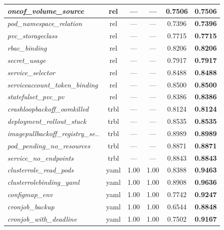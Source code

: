 \begin{footnotesize}
\begin{longtable}{|p{3.6cm}|c|c|c|c|c|}
\hline
\textit{oneof\_\allowbreak{}volume\_\allowbreak{}source} & rel & --- & --- & 0.7506 & \textbf{0.7506} \\
\hline
\textit{pod\_\allowbreak{}namespace\_\allowbreak{}relation} & rel & --- & --- & 0.7396 & \textbf{0.7396} \\
\hline
\textit{pvc\_\allowbreak{}storageclass} & rel & --- & --- & 0.7715 & \textbf{0.7715} \\
\hline
\textit{rbac\_\allowbreak{}binding} & rel & --- & --- & 0.8206 & \textbf{0.8206} \\
\hline
\textit{secret\_\allowbreak{}usage} & rel & --- & --- & 0.7917 & \textbf{0.7917} \\
\hline
\textit{service\_\allowbreak{}selector} & rel & --- & --- & 0.8488 & \textbf{0.8488} \\
\hline
\textit{serviceaccount\_\allowbreak{}token\_\allowbreak{}binding} & rel & --- & --- & 0.8500 & \textbf{0.8500} \\
\hline
\textit{statefulset\_\allowbreak{}pvc\_\allowbreak{}pv} & rel & --- & --- & 0.8386 & \textbf{0.8386} \\
\hline
\textit{crashloopbackoff\_\allowbreak{}oomkilled} & trbl & --- & --- & 0.8124 & \textbf{0.8124} \\
\hline
\textit{deployment\_\allowbreak{}rollout\_\allowbreak{}stuck} & trbl & --- & --- & 0.8535 & \textbf{0.8535} \\
\hline
\textit{imagepullbackoff\_\allowbreak{}registry\_\allowbreak{}se..} & trbl & --- & --- & 0.8989 & \textbf{0.8989} \\
\hline
\textit{pod\_\allowbreak{}pending\_\allowbreak{}no\_\allowbreak{}resources} & trbl & --- & --- & 0.8871 & \textbf{0.8871} \\
\hline
\textit{service\_\allowbreak{}no\_\allowbreak{}endpoints} & trbl & --- & --- & 0.8843 & \textbf{0.8843} \\
\hline
\textit{clusterrole\_\allowbreak{}read\_\allowbreak{}pods} & yaml & 1.00 & 1.00 & 0.8388 & \textbf{0.9463} \\
\hline
\textit{clusterrolebinding\_\allowbreak{}yaml} & yaml & 1.00 & 1.00 & 0.8908 & \textbf{0.9636} \\
\hline
\textit{configmap\_\allowbreak{}env} & yaml & 1.00 & 1.00 & 0.7742 & \textbf{0.9247} \\
\hline
\textit{cronjob\_\allowbreak{}backup} & yaml & 1.00 & 1.00 & 0.6544 & \textbf{0.8848} \\
\hline
\textit{cronjob\_\allowbreak{}with\_\allowbreak{}deadline} & yaml & 1.00 & 1.00 & 0.7502 & \textbf{0.9167} \\

\end{longtable}
\end{footnotesize}
